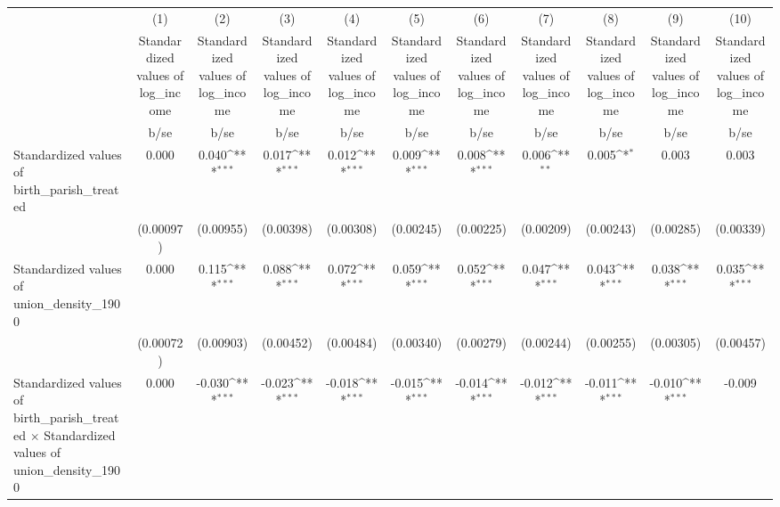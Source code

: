 {
\def\sym#1{\ifmmode^{#1}\else\(^{#1}\)\fi}
\begin{tabular}{l*{10}{c}}
\hline\hline
                    &\multicolumn{1}{c}{(1)}&\multicolumn{1}{c}{(2)}&\multicolumn{1}{c}{(3)}&\multicolumn{1}{c}{(4)}&\multicolumn{1}{c}{(5)}&\multicolumn{1}{c}{(6)}&\multicolumn{1}{c}{(7)}&\multicolumn{1}{c}{(8)}&\multicolumn{1}{c}{(9)}&\multicolumn{1}{c}{(10)}\\
                    &\multicolumn{1}{c}{Standardized values of log\_income}&\multicolumn{1}{c}{Standardized values of log\_income}&\multicolumn{1}{c}{Standardized values of log\_income}&\multicolumn{1}{c}{Standardized values of log\_income}&\multicolumn{1}{c}{Standardized values of log\_income}&\multicolumn{1}{c}{Standardized values of log\_income}&\multicolumn{1}{c}{Standardized values of log\_income}&\multicolumn{1}{c}{Standardized values of log\_income}&\multicolumn{1}{c}{Standardized values of log\_income}&\multicolumn{1}{c}{Standardized values of log\_income}\\
                    &        b/se         &        b/se         &        b/se         &        b/se         &        b/se         &        b/se         &        b/se         &        b/se         &        b/se         &        b/se         \\
\hline
Standardized values of birth\_parish\_treated&       0.000         &       0.040\sym{***}&       0.017\sym{***}&       0.012\sym{***}&       0.009\sym{***}&       0.008\sym{***}&       0.006\sym{**} &       0.005\sym{*}  &       0.003         &       0.003         \\
                    &   (0.00097)         &   (0.00955)         &   (0.00398)         &   (0.00308)         &   (0.00245)         &   (0.00225)         &   (0.00209)         &   (0.00243)         &   (0.00285)         &   (0.00339)         \\
Standardized values of union\_density\_1900&       0.000         &       0.115\sym{***}&       0.088\sym{***}&       0.072\sym{***}&       0.059\sym{***}&       0.052\sym{***}&       0.047\sym{***}&       0.043\sym{***}&       0.038\sym{***}&       0.035\sym{***}\\
                    &   (0.00072)         &   (0.00903)         &   (0.00452)         &   (0.00484)         &   (0.00340)         &   (0.00279)         &   (0.00244)         &   (0.00255)         &   (0.00305)         &   (0.00457)         \\
Standardized values of birth\_parish\_treated $\times$ Standardized values of union\_density\_1900&       0.000         &      -0.030\sym{***}&      -0.023\sym{***}&      -0.018\sym{***}&      -0.015\sym{***}&      -0.014\sym{***}&      -0.012\sym{***}&      -0.011\sym{***}&      -0.010\sym{***}&      -0.009         \\

\end{tabular}}
